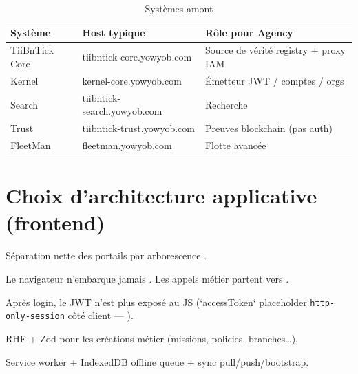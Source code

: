 \begin{table}[h]
\centering
\begin{tabular}{@{}llp{}@{}}
\toprule
\textbf{Système} & \textbf{Host typique} & \textbf{Rôle pour Agency} \\
\midrule
TiiBnTick Core & tiibntick-core.yowyob.com & Source de vérité registry + proxy IAM \\
Kernel & kernel-core.yowyob.com & Émetteur JWT / comptes / orgs \\
Search & tiibntick-search.yowyob.com & Recherche \\
Trust & tiibntick-trust.yowyob.com & Preuves blockchain (pas auth) \\
FleetMan & fleetman.yowyob.com & Flotte avancée \\
\bottomrule
\end{tabular}
\caption{Systèmes amont}
\end{table}

\section{Choix d'architecture applicative (frontend)}

\begin{description}[style=nextline]
  \item[App Router]
    Séparation nette des portails par arborescence .
  \item[BFF same-origin]
    Le navigateur n'embarque jamais . Les appels
    métier partent vers .
  \item[Session cookie HttpOnly]
    Après login, le JWT n'est plus exposé au JS (`accessToken` placeholder
    \texttt{http-only-session} côté client --- ).
  \item[Formulaires]
    RHF + Zod pour les créations métier (missions, policies, branches\ldots).
  \item[PWA livreur]
    Service worker + IndexedDB offline queue + sync pull/push/bootstrap.
\end{description}
